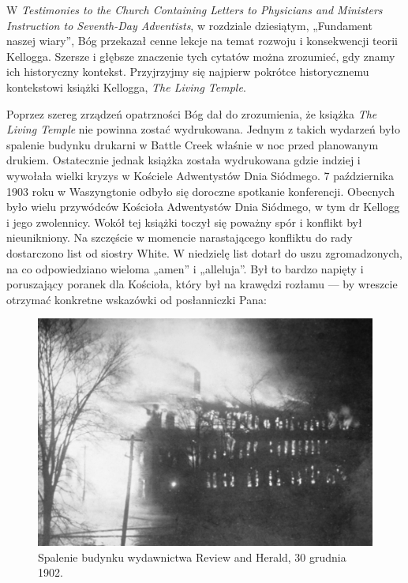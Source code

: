 
W \textit{Testimonies to the Church Containing Letters to Physicians and Ministers Instruction to Seventh-Day Adventists}, w rozdziale dziesiątym, „Fundament naszej wiary”, Bóg przekazał cenne lekcje na temat rozwoju i konsekwencji teorii Kellogga. Szersze i głębsze znaczenie tych cytatów można zrozumieć, gdy znamy ich historyczny kontekst. Przyjrzyjmy się najpierw pokrótce historycznemu kontekstowi książki Kellogga, \textit{The Living Temple}.

Poprzez szereg zrządzeń opatrzności Bóg dał do zrozumienia, że książka \textit{The Living Temple} nie powinna zostać wydrukowana. Jednym z takich wydarzeń było spalenie budynku drukarni w Battle Creek właśnie w noc przed planowanym drukiem. Ostatecznie jednak książka została wydrukowana gdzie indziej i wywołała wielki kryzys w Kościele Adwentystów Dnia Siódmego. 7 października 1903 roku w Waszyngtonie odbyło się doroczne spotkanie konferencji. Obecnych było wielu przywódców Kościoła Adwentystów Dnia Siódmego, w tym dr Kellogg i jego zwolennicy. Wokół tej książki toczył się poważny spór i konflikt był nieunikniony. Na szczęście w momencie narastającego konfliktu do rady dostarczono list od siostry White. W niedzielę list dotarł do uszu zgromadzonych, na co odpowiedziano wieloma „amen” i „alleluja”. Był to bardzo napięty i poruszający poranek dla Kościoła, który był na krawędzi rozłamu — by wreszcie otrzymać konkretne wskazówki od posłanniczki Pana:

\begin{figure}[h]
    \centering
    \includegraphics[width=1\linewidth]{images/review-and-herlad.jpg}
    \caption*{Spalenie budynku wydawnictwa Review and Herald, 30 grudnia 1902.}
    \label{fig:review-and-herald}
\end{figure}

